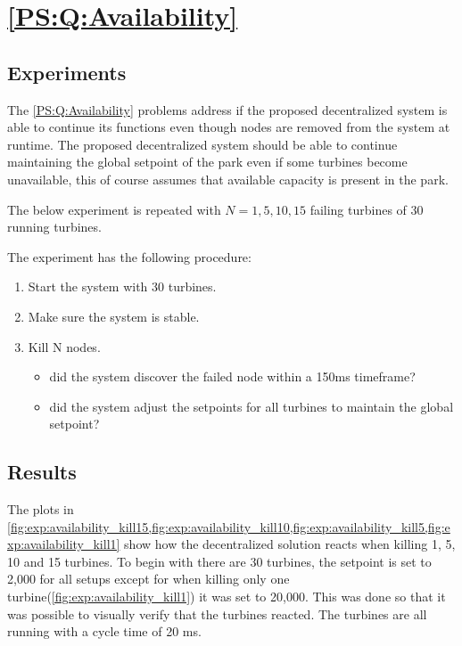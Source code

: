 \section{\ref{PS:Q:Availability}}

\subsection{Experiments}
The \ref{PS:Q:Availability} problems address if the proposed decentralized system is able to continue its functions even though nodes are removed from the system at runtime.
The proposed decentralized system should be able to continue maintaining the global setpoint of the park even if some turbines become unavailable, this of course assumes that available capacity is present in the park.

The below experiment is repeated with $N = 1, 5, 10, 15$ failing turbines of 30 running turbines.

The experiment has the following procedure:
\begin{enumerate}
	\item Start the system with 30 turbines.
	\item Make sure the system is stable.
	\item Kill N nodes.
	\begin{itemize}
		\item did the system discover the failed node within a 150ms timeframe?
		\item did the system adjust the setpoints for all turbines to maintain the global setpoint?
	\end{itemize}
\end{enumerate}

\subsection{Results}
\label{sec:res:availability}
The plots in \cref{fig:exp:availability_kill15,fig:exp:availability_kill10,fig:exp:availability_kill5,fig:exp:availability_kill1} show how the decentralized solution reacts when killing 1, 5, 10 and 15 turbines. To begin with there are 30 turbines, the setpoint is set to 2,000 for all setups except for when killing only one turbine(\cref{fig:exp:availability_kill1}) it was set to 20,000. This was done so that it was possible to visually verify that the turbines reacted.
The turbines are all running with a cycle time of 20 ms.

